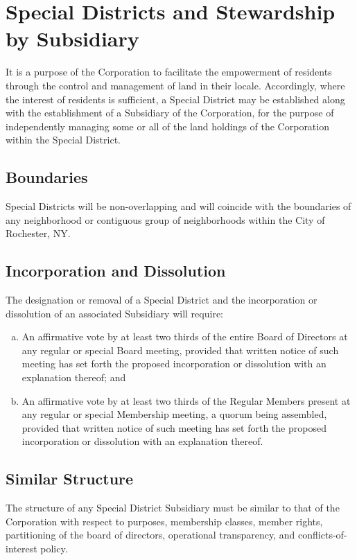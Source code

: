 \section{Special Districts and Stewardship by Subsidiary}
\noindent
It is a purpose of the Corporation to facilitate the empowerment of
residents through the control and management of land in their
locale. Accordingly, where the interest of residents is sufficient, a
Special District may be established along with the establishment of a
Subsidiary of the Corporation, for the purpose of independently
managing some or all of the land holdings of the Corporation within
the Special District.

\subsection{Boundaries}
Special Districts will be non-overlapping and will coincide with the
boundaries of any neighborhood or contiguous group of neighborhoods
within the City of Rochester, NY.

\subsection{Incorporation and Dissolution}
The designation or removal of a Special District and the incorporation
or dissolution of an associated Subsidiary will require:
\begin{enumerate}[a.]
  \item An affirmative vote by at least two thirds of the entire Board
    of Directors at any regular or special Board meeting, provided
    that written notice of such meeting has set forth the proposed
    incorporation or dissolution with an explanation thereof; and
  \item An affirmative vote by at least two thirds of the Regular
    Members present at any regular or special Membership meeting, a
    quorum being assembled, provided that written notice of such
    meeting has set forth the proposed incorporation or dissolution
    with an explanation thereof.
\end{enumerate}

\subsection{Similar Structure}
The structure of any Special District Subsidiary must be similar to
that of the Corporation with respect to purposes, membership classes,
member rights, partitioning of the board of directors, operational
transparency, and conflicts-of-interest policy.

